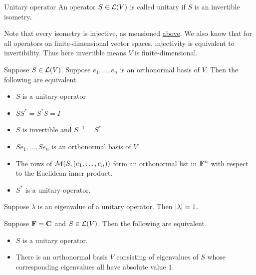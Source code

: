 \documentclass[12pt,a4paper]{article}
\begin{document}
    \begin{defi}{Unitary operator}%
        An operator $S\in\mathcal{L}(V)$ is called unitary if $S$ is an invertible isometry.
    \end{defi}
    \begin{remark}
        Note that every isometry is injective, as mensioned \hyperref[7.25r]{above}. We also know that for all operators on finite-dimensional vector spaces, injectivity is equivalent to invertibility. Thus here invertible means $V$ is finite-dimensional. 
    \end{remark}
    \begin{prop}\label{7.30}
        Suppose $S\in\mathcal{L}(V)$. Suppose $e_1,\dots,e_n$ is an orthonormal basis of $V$. Then the following are equivalent
        \begin{itemize}
            \item $S$ is a unitary operator
            \item $SS^*=S^*S=I$
            \item $S$ is invertible and $S^{-1}=S^*$
            \item $Se_1,\dots,Se_n$ is an orthonormal basis of $V$
            \item The rows of $\mathcal{M}(S,(e_1,\dots,e_n))$ form an orthonormal list in $\mathbf{F}^n$ with respect to the Euclidean inner product.
            \item $S^*$ is a unitary operator.
        \end{itemize}
    \end{prop}
    \begin{remark}
        Suppose $\lambda$ is an eigenvalue of a unitary operator. Then $\left\lvert \lambda\right\rvert=1$.
    \end{remark}
    \hfill

    \begin{prop}
        Suppose $\mathbf{F}=\mathbf{C}$ and $S\in\mathcal{L}(V)$. Then the following are equivalent.
        \begin{itemize}
            \item $S$ is a unitary operator.
            \item There is an orthonormal basis $V$ consisting of eigenvalues of $S$ whose corresponding eigenvalues all have absolute value $1$.
        \end{itemize}
    \end{prop}
    \hfill
\end{document}
